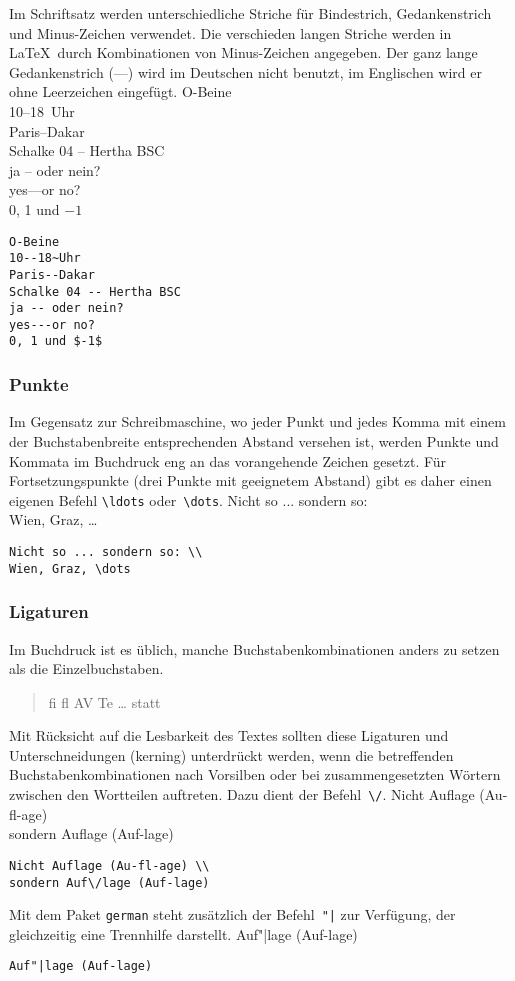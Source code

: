 Im Schriftsatz werden unterschiedliche Striche für Bindestrich,
Gedankenstrich und Minus-Zeichen verwendet.
Die verschieden langen Striche werden in \LaTeX\ durch
Kombinationen von Minus-Zeichen angegeben. Der ganz lange
Gedankenstrich (\mbox{---}) wird im Deutschen nicht benutzt, im
Englischen wird er ohne Leerzeichen eingefügt.
\exa
O-Beine \\
10--18~Uhr \\
Paris--Dakar \\
Schalke 04 -- Hertha BSC \\
ja -- oder nein? \\
yes---or no? \\
0, 1 und $-1$
\exb
\begin{verbatim}
O-Beine
10--18~Uhr
Paris--Dakar
Schalke 04 -- Hertha BSC
ja -- oder nein?
yes---or no?
0, 1 und $-1$
\end{verbatim}
\exc
 
\subsubsection{Punkte}
 
Im Gegensatz zur Schreibmaschine, wo jeder Punkt und jedes Komma
mit einem der Buchstabenbreite entsprechenden Abstand versehen
ist, werden Punkte und Kommata im Buchdruck eng an das
vorangehende Zeichen gesetzt. Für Fortsetzungspunkte (drei
Punkte mit geeignetem Abstand) gibt es daher einen eigenen Befehl
\verb|\ldots| oder~\verb|\dots|.
\exa
Nicht so ... sondern so: \\
Wien, Graz, \dots
\exb
\begin{verbatim}
Nicht so ... sondern so: \\
Wien, Graz, \dots
\end{verbatim}
\exc
 
\subsubsection{Ligaturen}
 
Im Buchdruck ist es üblich, manche Buchstabenkombinationen
anders zu setzen als die Einzelbuchstaben.
\begin{verse}
{\large fi fl AV Te \dots}\quad
statt
\end{verse}
Mit Rücksicht auf die Lesbarkeit des Textes sollten
diese  Ligaturen und Unterschneidungen (kerning) 
unterdrückt werden, wenn die betreffenden Buchstabenkombinationen 
nach Vorsilben oder bei zusammengesetzten Wörtern zwischen den
Wortteilen auftreten.  Dazu dient der Befehl~\verb|\/|.
\exa
Nicht Auflage (Au-fl-age) \\
sondern Auf\/lage (Auf-lage)
\exb
\begin{verbatim}
Nicht Auflage (Au-fl-age) \\
sondern Auf\/lage (Auf-lage)
\end{verbatim}
\exc
Mit dem Paket \texttt{german} steht zusätzlich der
Befehl~\verb:"|: zur Verfügung, der gleichzeitig eine
Trennhilfe darstellt.
\exa
Auf"|lage (Auf-lage)
\exb
\begin{verbatim}
Auf"|lage (Auf-lage)
\end{verbatim}
\exc

